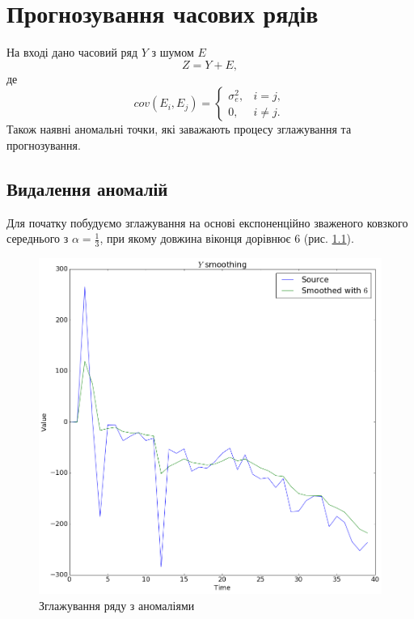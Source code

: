 \chapter{Прогнозування часових рядів}

На вході дано часовий ряд $Y$ з шумом $E$
\begin{equation*}
  Z = Y + E,
\end{equation*}
де
\begin{equation*}
  cov(E_i, E_j) =
    \begin{cases}
      \sigma_e^2,& i = j, \\
      0,&          i \neq j.
    \end{cases}
\end{equation*}
Також наявні аномальні точки,
які заважають процесу зглажування та прогнозування.

\section{Видалення аномалій}

Для початку побудуємо зглажування на основі експоненційно зваженого
ковзкого середнього з $\alpha = \frac{1}{3}$,
при якому довжина віконця дорівнює $6$ (рис. \ref{fig:anomaly:source}).
\begin{figure}[h!]
  \centering
  \includegraphics[width=\textwidth]{Coursework_files/Coursework_12_0.png}
  \caption{Зглажування ряду з аномаліями}
  \label{fig:anomaly:source}
\end{figure}


